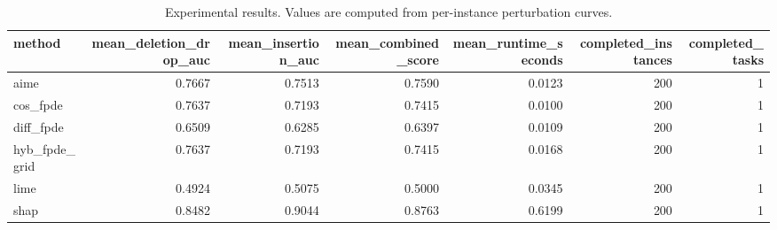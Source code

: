 \begin{table}[t]
\caption{Experimental results. Values are computed from per-instance perturbation curves.}
\label{tab:main_results_computed}
\centering
\begin{tabular}{lrrrrrr}
\toprule
method & mean\_deletion\_drop\_auc & mean\_insertion\_auc & mean\_combined\_score & mean\_runtime\_seconds & completed\_instances & completed\_tasks \\
\midrule
aime & 0.7667 & 0.7513 & 0.7590 & 0.0123 & 200 & 1 \\
cos\_fpde & 0.7637 & 0.7193 & 0.7415 & 0.0100 & 200 & 1 \\
diff\_fpde & 0.6509 & 0.6285 & 0.6397 & 0.0109 & 200 & 1 \\
hyb\_fpde\_grid & 0.7637 & 0.7193 & 0.7415 & 0.0168 & 200 & 1 \\
lime & 0.4924 & 0.5075 & 0.5000 & 0.0345 & 200 & 1 \\
shap & 0.8482 & 0.9044 & 0.8763 & 0.6199 & 200 & 1 \\
\bottomrule
\end{tabular}

\end{table}
